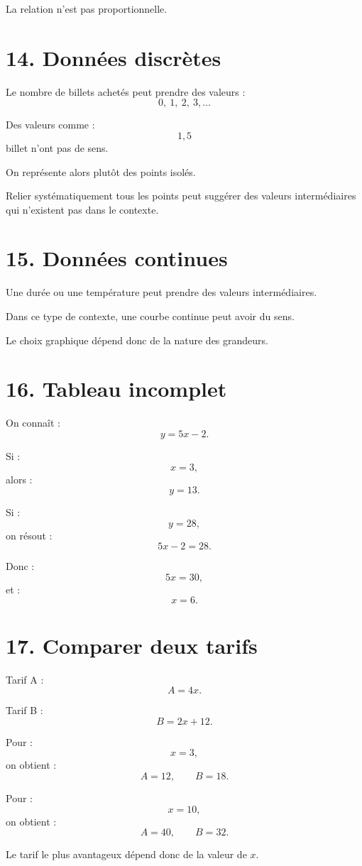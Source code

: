La relation n'est pas proportionnelle.

\section{14. Données discrètes}

Le nombre de billets achetés peut prendre des valeurs :
\[
0,\ 1,\ 2,\ 3,\ldots
\]

Des valeurs comme :
\[
1{,}5
\]
billet n'ont pas de sens.

On représente alors plutôt des points isolés.

\begin{attention}
Relier systématiquement tous les points peut suggérer des valeurs intermédiaires qui n'existent pas dans le contexte.
\end{attention}

\section{15. Données continues}

Une durée ou une température peut prendre des valeurs intermédiaires.

Dans ce type de contexte, une courbe continue peut avoir du sens.

Le choix graphique dépend donc de la nature des grandeurs.

\section{16. Tableau incomplet}

On connaît :
\[
y=5x-2.
\]

Si :
\[
x=3,
\]
alors :
\[
y=13.
\]

Si :
\[
y=28,
\]
on résout :
\[
5x-2=28.
\]

Donc :
\[
5x=30,
\]
et :
\[
x=6.
\]

\section{17. Comparer deux tarifs}

Tarif A :
\[
A=4x.
\]

Tarif B :
\[
B=2x+12.
\]

Pour :
\[
x=3,
\]
on obtient :
\[
A=12,\qquad B=18.
\]

Pour :
\[
x=10,
\]
on obtient :
\[
A=40,\qquad B=32.
\]

Le tarif le plus avantageux dépend donc de la valeur de $x$.

